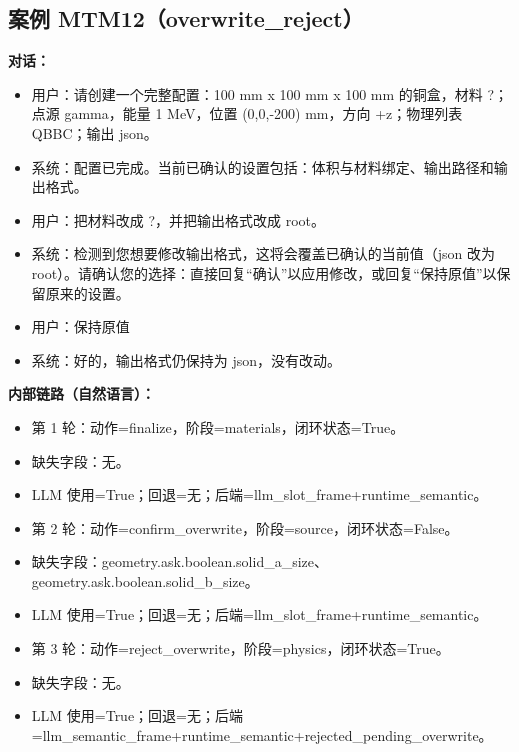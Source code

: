 \documentclass[11pt]{ctexart}
\begin{document}
\subsection{案例 MTM12（overwrite\_reject）}
\textbf{对话：}
\begin{itemize}
\item 用户：请创建一个完整配置：100 mm x 100 mm x 100 mm 的铜盒，材料 ?；点源 gamma，能量 1 MeV，位置 (0,0,-200) mm，方向 +z；物理列表 QBBC；输出 json。
\item 系统：配置已完成。当前已确认的设置包括：体积与材料绑定、输出路径和输出格式。
\item 用户：把材料改成 ?，并把输出格式改成 root。
\item 系统：检测到您想要修改输出格式，这将会覆盖已确认的当前值（json 改为 root）。请确认您的选择：直接回复“确认”以应用修改，或回复“保持原值”以保留原来的设置。
\item 用户：保持原值
\item 系统：好的，输出格式仍保持为 json，没有改动。
\end{itemize}
\textbf{内部链路（自然语言）：}
\begin{itemize}
\item 第 1 轮：动作=finalize，阶段=materials，闭环状态=True。
\item 缺失字段：无。
\item LLM 使用=True；回退=无；后端=llm\_slot\_frame+runtime\_semantic。
\item 第 2 轮：动作=confirm\_overwrite，阶段=source，闭环状态=False。
\item 缺失字段：geometry.ask.boolean.solid\_a\_size、geometry.ask.boolean.solid\_b\_size。
\item LLM 使用=True；回退=无；后端=llm\_slot\_frame+runtime\_semantic。
\item 第 3 轮：动作=reject\_overwrite，阶段=physics，闭环状态=True。
\item 缺失字段：无。
\item LLM 使用=True；回退=无；后端=llm\_semantic\_frame+runtime\_semantic+rejected\_pending\_overwrite。
\end{itemize}
\end{document}
